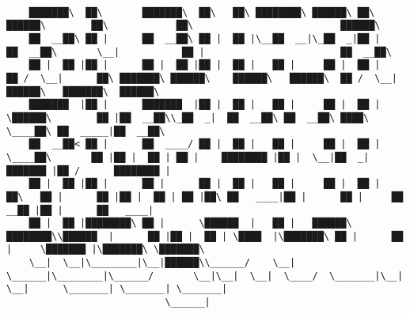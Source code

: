 \documentclass[varwidth=\maxdimen,margin=0.5cm,multi={verbatim}]{standalone}
\begin{document}
\begin{verbatim}

    ███████\  ██\       ███████\  ██\   ██\ ████████\ ██████\ ██\       ██████\        ██\            ██\                          ██████\
    ██  __██\ ██ |      ██  __██\ ██ |  ██ |\__██  __|\_██  _|██ |     ██  __██\       \__|           ██ |                        ██  __██\
    ██ |  ██ |██ |      ██ |  ██ |██ |  ██ |   ██ |     ██ |  ██ |     ██ /  \__|      ██\ ███████\ ██████\    ██████\   ██████\  ██ /  \__|██████\   ███████\  ██████\
    ███████  |██ |      ███████  |██ |  ██ |   ██ |     ██ |  ██ |     \██████\        ██ |██  __██\\_██  _|  ██  __██\ ██  __██\ ████\     \____██\ ██  _____|██  __██\
    ██  __██< ██ |      ██  ____/ ██ |  ██ |   ██ |     ██ |  ██ |      \____██\       ██ |██ |  ██ | ██ |    ████████ |██ |  \__|██  _|    ███████ |██ /      ████████ |
    ██ |  ██ |██ |      ██ |      ██ |  ██ |   ██ |     ██ |  ██ |     ██\   ██ |      ██ |██ |  ██ | ██ |██\ ██   ____|██ |      ██ |     ██  __██ |██ |      ██   ____|
    ██ |  ██ |████████\ ██ |      \██████  |   ██ |   ██████\ ████████\\██████  |      ██ |██ |  ██ | \████  |\███████\ ██ |      ██ |     \███████ |\███████\ \███████\
    \__|  \__|\________|\__|██████\\______/    \__|   \______|\________|\______/       \__|\__|  \__|  \____/  \_______|\__|      \__|      \_______| \_______| \_______|
                            \______|





\end{verbatim}
\end{document}

